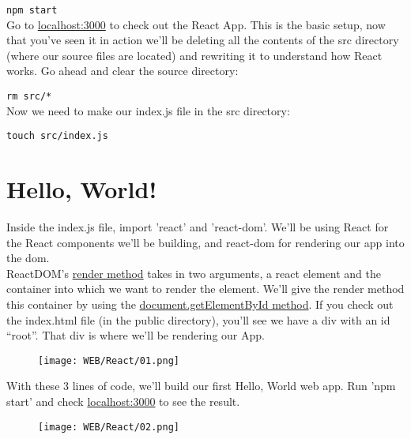 \documentclass{42-en}
\begin{document}
\texttt{npm start}\\
\newline
Go to \href{localhost:3000}{localhost:3000} to check out the React App. This is the basic setup, now that you’ve seen it in action we’ll be deleting all the contents of the src directory (where our source files are located) and rewriting it to understand how React works. Go ahead and clear the source directory:

\texttt{rm src/*}\\
\newline
Now we need to make our index.js file in the src directory:

\texttt{touch src/index.js}
\section{Hello, World!}
Inside the index.js file, import 'react' and 'react-dom'. We’ll be using React for the React components we’ll be building, and react-dom for rendering our app into the dom. \\

ReactDOM’s \href{https://reactjs.org/docs/react-dom.html#render}{render method} takes in two arguments, a react element and the container into which we want to render the element. We’ll give the render method this container by using the \href{https://developer.mozilla.org/en-US/docs/Web/API/Document/getElementById}{document.getElementById method}. If you check out the index.html file (in the public directory), you’ll see we have a div with an id “root”. That div is where we’ll be rendering our App.
\begin{figure}[H]
    \begin{center}
        \texttt{[image: WEB/React/01.png]}
    \end{center}
\end{figure}
With these 3 lines of code, we’ll build our first Hello, World web app. Run 'npm start’ and check \href{localhost:3000}{localhost:3000} to see the result.
\begin{figure}[H]
    \begin{center}
        \texttt{[image: WEB/React/02.png]}
    \end{center}
\end{figure}
\end{document}
